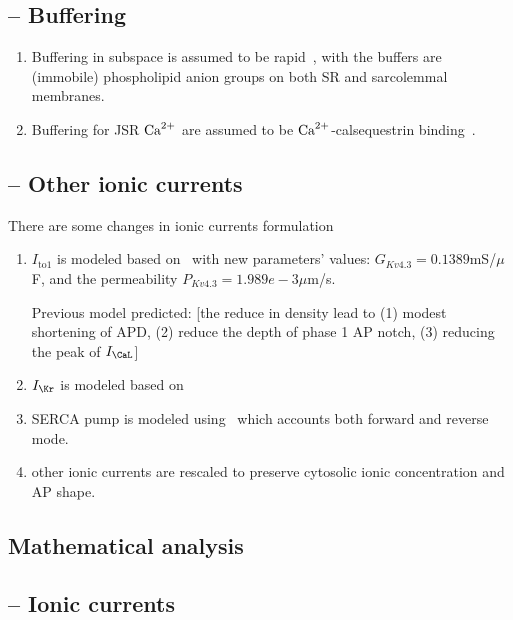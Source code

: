  
\subsection{-- Buffering}
\label{sec:buffering-3}
\begin{enumerate}
\item Buffering in subspace is assumed to be
  rapid~\citep{wagner1994erb}, with the buffers are (immobile)
  phospholipid anion groups on both SR and sarcolemmal membranes.

\item Buffering for JSR ${\text{Ca}^{2+}}$ are assumed to be ${\text{Ca}^{2+}}$-calsequestrin
  binding~\citep{shannon2000rms}.

\end{enumerate}
\subsection{-- Other ionic currents}
\label{sec:other-ionic-currents}

There are some changes in ionic currents formulation
\begin{enumerate}
\item $I_\text{to1}$ is modeled based on~\citep{greenstein2000} with
  new parameters' values: $G_{Kv4.3} = 0.1389$mS/$\mu$F, and the
  permeability $P_{Kv4.3}=1.989e-3\mu$m/s.

  Previous model predicted: [the reduce in density lead to (1) modest
  shortening of APD, (2) reduce the depth of phase 1 AP notch, (3)
  reducing the peak of $I_\CaL$]

\item $I_\Kr$ is modeled based on~\citep{mazhari2001}
\item SERCA pump is modeled using~\citep{shannon2000rms} which
  accounts both forward and reverse mode. 

\item other ionic currents are rescaled to preserve cytosolic ionic
  concentration and AP shape.
\end{enumerate}

\subsection{Mathematical analysis}
\label{sec:math-analys-2}

\subsection{-- Ionic currents}
\label{sec:ionic-currents-9}

